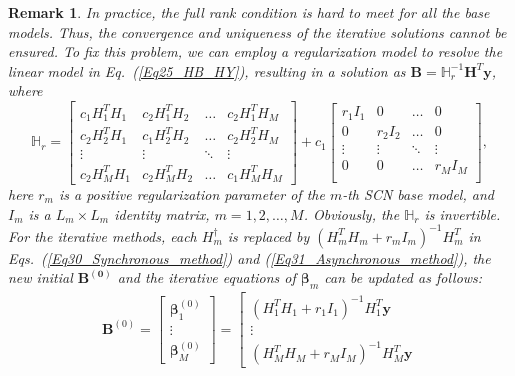 \documentclass{article}
\newtheorem{remark}{Remark}
\begin{document}
\begin{remark}
In practice, the full rank condition is hard to meet for all the base models. Thus, the convergence and  uniqueness of the iterative solutions cannot be ensured. To fix this problem, we can employ a regularization model to resolve the linear model in Eq.~(\ref{Eq25_HB_HY}), resulting in a solution as $\bm{B}=\mathbb{H}_r^{-1}\bm{H}^T\bm{y}$, where
\begin{equation}
\label{Eq43_HR}
\mathbb{H}_r = 
\left[
\begin{array}{cccc}
c_1H_1^TH_1 & c_2H_1^TH_2 & \ldots & c_2H_1^TH_M \\
c_2H_2^TH_1 & c_1H_2^TH_2 & \ldots & c_2H_2^TH_M \\
\vdots & \vdots & \ddots & \vdots \\
c_2H_M^TH_1 & c_2H_M^TH_2 & \ldots & c_1H_M^TH_M
\end{array}
\right]
+c_1  
\left[
\begin{array}{cccc}
r_1I_1 & 0 & \ldots & 0\\
0 & r_2I_2 & \ldots & 0\\
\vdots & \vdots & \ddots & \vdots\\
0 & 0 & \ldots & r_M I_M\\
\end{array}
\right],
\end{equation}
here $r_m$ is a positive regularization parameter of the $m$-th SCN base model, and $I_m$ is a $L_m \times L_m$ identity matrix, $m = 1, 2, \dots, M$.
Obviously, the  $\mathbb{H}_r$ is invertible. 
For the iterative methods, each $H_m^{\dagger}$ is replaced by $(H_m^TH_m + r_m I_m)^{-1}H_m^T$ in Eqs.~(\ref{Eq30_Synchronous_method}) and (\ref{Eq31_Asynchronous_method}),  the new initial $\bm{B^{(0)}}$ and the iterative equations of $\bm{\beta}_{m}$ can be updated as follows:
\begin{eqnarray}
\bm{B}^{(0)} = \left[
\begin{array}{c}
\bm{\beta}_1^{(0)}  \\
\vdots  \\
\bm{\beta}_M^{(0)} 
\end{array} \right] 
= \left[
\begin{array}{c}
(H_1^TH_1 + r_1 I_1)^{-1}H_1^T \bm{y}  \\
\vdots  \\
(H_M^TH_M + r_M I_M)^{-1}H_M^T \bm{y} 

\end{array}
\end{eqnarray}
\end{remark}
\end{document}
